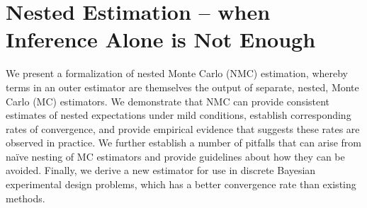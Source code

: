 
\chapter{Nested Estimation -- when Inference Alone is Not Enough}
\label{chp:nest}


We present a formalization of nested Monte Carlo (NMC) estimation, whereby
terms in an outer estimator are themselves the output of separate, nested, Monte Carlo (MC) estimators.
We demonstrate that NMC can provide consistent estimates of 
nested expectations under mild conditions, 
establish corresponding rates of convergence, 
and provide empirical evidence that suggests these rates are observed in practice.
We further establish a number of pitfalls that can arise from na\"{i}ve nesting of MC estimators
and provide guidelines about how they can be avoided.
Finally, we derive a new estimator for use in discrete Bayesian 
experimental design problems, which has a better convergence rate than 
existing methods.










\clearpage

